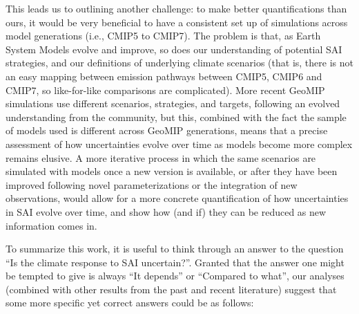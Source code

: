 \documentclass[draft]{agujournal2019}
\begin{document}
This leads us to outlining another challenge: to make better quantifications than ours, it would be very beneficial to have a consistent set up of simulations across model generations (i.e., CMIP5 to CMIP7). The problem is that, as Earth System Models evolve and improve, so does our understanding of potential SAI strategies, and our definitions of underlying climate scenarios (that is, there is not an easy mapping between emission pathways between CMIP5, CMIP6 and CMIP7, so like-for-like comparisons are complicated). More recent GeoMIP simulations use different scenarios, strategies, and targets, following an evolved understanding from the community, but this, combined with the fact the sample of models used is different across GeoMIP generations, means that a precise assessment of how uncertainties evolve over time as models become more complex remains elusive. A more iterative process \cite <as proposed for instance by>[]{visioni_living2024} in which the same scenarios are simulated with models once a new version is available, or after they have been improved following novel parameterizations or the integration of new observations, would allow for a more concrete quantification of how uncertainties in SAI evolve over time, and show how (and if) they can be reduced as new information comes in.

To summarize this work, it is useful to think through an answer to the question ``Is the climate response to SAI uncertain?''. Granted that the answer one might be tempted to give is always ``It depends'' or ``Compared to what'', our analyses (combined with other results from the past and recent literature) suggest that some more specific yet correct answers could be as follows:
\end{document}
